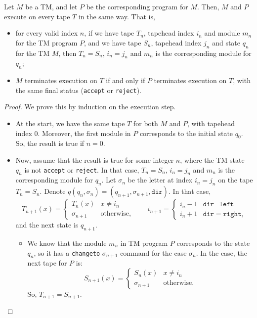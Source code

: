 \begin{appendices}
\begin{theorem} \label{thm:TM_to_TMP}
    Let $M$ be a TM, and let $P$ be the corresponding program for $M$. Then, $M$ and $P$ execute on every tape $T$ in the same way. That is, 
    \begin{itemize}
        \item for every valid index $n$, if we have tape $T_n$, tapehead index $i_n$ and module $m_n$ for the TM program $P$, and we have tape $S_n$, tapehead index $j_n$ and state $q_n$ for the TM $M$, then $T_n = S_n$, $i_n = j_n$ and $m_n$ is the corresponding module for $q_n$;
        \item $M$ terminates execution on $T$ if and only if $P$ terminates execution on $T$, with the same final status (\texttt{accept} or \texttt{reject}).
    \end{itemize}
\end{theorem}
\begin{proof}
    We prove this by induction on the execution step. 
    \begin{itemize}
        \item At the start, we have the same tape $T$ for both $M$ and $P$, with tapehead index $0$. Moreover, the first module in $P$ corresponds to the initial state $q_0$. So, the result is true if $n = 0$.
        
        \item Now, assume that the result is true for some integer $n$, where the TM state $q_n$ is not \texttt{accept} or \texttt{reject}. In that case, $T_n = S_n$, $i_n = j_n$ and $m_n$ is the corresponding module for $q_n$. Let $\sigma_n$ be the letter at index $i_n = j_n$ on the tape $T_n = S_n$. Denote $q(q_n, \sigma_n) = (q_{n+1}, \sigma_{n+1}, \texttt{dir})$. In that case,
        \[T_{n+1}(x) = \begin{cases}
            T_n(x) & x \neq i_n \\
            \sigma_{n+1} & \text{otherwise},
        \end{cases} \qquad i_{n+1} = \begin{cases}
            i_n - 1 & \texttt{dir} = \texttt{left} \\
            i_n + 1 & \texttt{dir} = \texttt{right},
        \end{cases}\]
        and the next state is $q_{n+1}$. 
        
        \begin{itemize}
            \item We know that the module $m_n$ in TM program $P$ corresponds to the state $q_n$, so it has a \texttt{changeto} $\sigma_{n+1}$ command for the case $\sigma_n$. In the case, the next tape for $P$ is:
            \[S_{n+1}(x) = \begin{cases}
                S_n(x) & x \neq i_n \\
                \sigma_{n+1} & \text{otherwise}.
            \end{cases}\]
            So, $T_{n+1} = S_{n+1}$. 
            

\end{itemize}
\end{itemize}
\end{proof}
\end{appendices}
